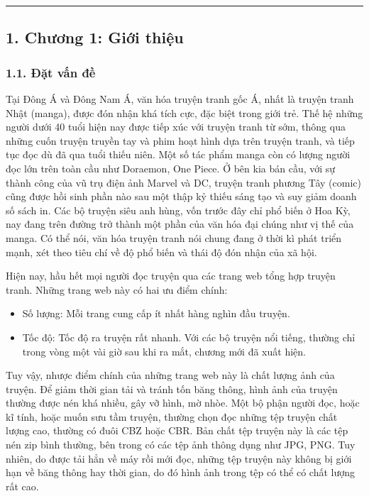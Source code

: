 \documentclass[
]{article}
\begin{document}
\begin{center}\rule{0.5\linewidth}{0.5pt}\end{center}

\hypertarget{chux1b0ux1a1ng-1-giux1edbi-thiux1ec7u}{%
\subsection{\texorpdfstring{1. Chương 1: Giới thiệu
}{1. Chương 1: Giới thiệu }}\label{chux1b0ux1a1ng-1-giux1edbi-thiux1ec7u}}

\hypertarget{ux111ux1eb7t-vux1ea5n-ux111ux1ec1}{%
\subsubsection{\texorpdfstring{1.1. Đặt vấn đề
}{1.1. Đặt vấn đề }}\label{ux111ux1eb7t-vux1ea5n-ux111ux1ec1}}

Tại Đông Á và Đông Nam Á, văn hóa truyện tranh gốc Á, nhất là truyện
tranh Nhật (manga), được đón nhận khá tích cực, đặc biệt trong giới trẻ.
Thế hệ những người dưới 40 tuổi hiện nay được tiếp xúc với truyện tranh
từ sớm, thông qua những cuốn truyện truyền tay và phim hoạt hình dựa
trên truyện tranh, và tiếp tục đọc dù đã qua tuổi thiếu niên. Một số tác
phẩm manga còn có lượng người đọc lớn trên toàn cầu như Doraemon, One
Piece. Ở bên kia bán cầu, với sự thành công của vũ trụ điện ảnh Marvel
và DC, truyện tranh phương Tây (comic) cũng được hồi sinh phần nào sau
một thập kỷ thiếu sáng tạo và suy giảm doanh số sách in. Các bộ truyện
siêu anh hùng, vốn trước đây chỉ phổ biến ở Hoa Kỳ, nay đang trên đường
trở thành một phần của văn hóa đại chúng như vị thế của manga. Có thể
nói, văn hóa truyện tranh nói chung đang ở thời kì phát triển mạnh, xét
theo tiêu chí về độ phổ biến và thái độ đón nhận của xã hội.

Hiện nay, hầu hết mọi người đọc truyện qua các trang web tổng hợp truyện
tranh. Những trang web này có hai ưu điểm chính:

\begin{itemize}
\item
  Số lượng: Mỗi trang cung cấp ít nhất hàng nghìn đầu truyện.
\item
  Tốc độ: Tốc độ ra truyện rất nhanh. Với các bộ truyện nổi tiếng,
  thường chỉ trong vòng một vài giờ sau khi ra mắt, chương mới đã xuất
  hiện.
\end{itemize}

Tuy vậy, nhược điểm chính của những trang web này là chất lượng ảnh của
truyện. Để giảm thời gian tải và tránh tốn băng thông, hình ảnh của
truyện thường được nén khá nhiều, gây vỡ hình, mờ nhòe. Một bộ phận
người đọc, hoặc kĩ tính, hoặc muốn sưu tầm truyện, thường chọn đọc những
tệp truyện chất lượng cao, thường có đuôi CBZ hoặc CBR. Bản chất tệp
truyện này là các tệp nén zip bình thường, bên trong có các tệp ảnh
thông dụng như JPG, PNG. Tuy nhiên, do được tải hẳn về máy rồi mới đọc,
những tệp truyện này không bị giới hạn về băng thông hay thời gian, do
đó hình ảnh trong tệp có thể có chất lượng rất cao.
\end{document}

